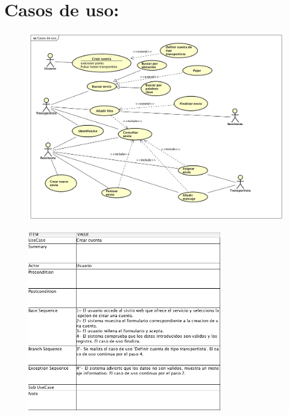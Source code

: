 \documentclass[10pt, a4paper,spanish]{article}
\begin{document}
	\section{Casos de uso:}


		\begin{figure}[H]
			\centering
				\includegraphics[width=\textwidth]{astah/casos_de_uso.png}
		\end{figure}

		\begin{figure}[H]
			\centering
				\includegraphics[width=0.75\textwidth]{astah/use_case_crear_cuenta.png}
		\end{figure}
\end{document}
